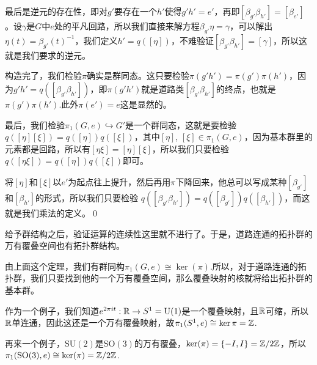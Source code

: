 最后是逆元的存在性，即对$g'$要存在一个$h'$使得$g'h'=e'$，再即$[\beta_{g'}\beta_{h'}]=[\beta_{e'}]$。设$\gamma$是$G$中$e$处的平凡回路，所以我们直接来解方程$\beta_{g'}\eta=\gamma$，可以解出$\eta(t)=\beta_{g'}(t)^{-1}$，我们定义$h'=q([\eta])$，不难验证$[\beta_{g'}\beta_{h'}]=[\gamma]$，所以这就是我们要求的逆元。

构造完了，我们检验$\pi$确实是群同态。这只要检验$\pi(g'h')=\pi(g')\pi(h')$，因为$g'h'=q([\beta_{g'}\beta_{h'}])$，即$\pi(g'h')$就是道路类$[\beta_{g'}\beta_{h'}]$的终点，也就是$\pi(g')\pi(h')$.此外$\pi(e')=e$这是显然的。

最后，我们检验$\pi_1(G,e)\hookrightarrow G'$是一个群同态，这就是要检验$q([\eta][\xi])=q([\eta])q([\xi])$，其中$[\eta]$, $[\xi]\in \pi_1(G,e)$，因为基本群里的元素都是回路，所以有$[\eta\xi]=[\eta][\xi]$，所以我们只要检验$q([\eta\xi])=q([\eta])q([\xi])$即可。

将$[\eta]$和$[\xi]$以$e'$为起点往上提升，然后再用$\pi$下降回来，他总可以写成某种$[\beta_{g'}]$和$[\beta_{h'}]$的形式，所以我们只要检验
$q([\beta_{g'}\beta_{h'}])=q([\beta_{g'}])q([\beta_{h'}])$，而这就是我们乘法的定义。\qed

\para 给予群结构之后，验证运算的连续性这里就不进行了。于是，道路连通的拓扑群的万有覆叠空间也有拓扑群结构。

\para 由上面这个定理，我们有群同构$\pi_1(G,e)\cong \ker(\pi)$.所以，对于道路连通的拓扑群，我们只要找到他的一个万有覆叠空间，那么覆叠映射的核就将给出拓扑群的基本群。

作为一个例子，我们知道$e^{2\pi it}:\mathbb{R}\to S^1=\mathrm{U}(1)$是一个覆叠映射，且$\mathbb{R}$可缩，所以$\mathbb{R}$单连通，因此这还是一个万有覆叠映射，故$\pi_1(S^1,e)\cong \ker{\pi}=\mathbb{Z}$.

再来一个例子，$\mathrm{SU}(2)$是$\mathrm{SO}(3)$的万有覆叠，$\ker(\pi)=\{-I,I\}=\mathbb{Z}/2\mathbb{Z}$，所以$\pi_1(\mathrm{SO}(3),e)\cong \ker(\pi)=\mathbb{Z}/2\mathbb{Z}$.
